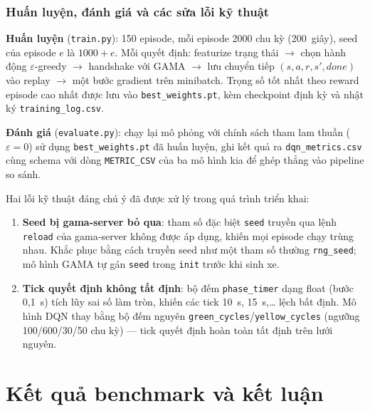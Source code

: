 \documentclass[11pt,a4paper]{article}
\begin{document}
\subsubsection*{Huấn luyện, đánh giá và các sửa lỗi kỹ thuật}

\textbf{Huấn luyện} (\texttt{train.py}): 150 episode, mỗi episode 2000 chu kỳ
(200~giây), seed của episode $e$ là $1000 + e$. Mỗi quyết định: featurize trạng thái
$\rightarrow$ chọn hành động $\varepsilon$-greedy $\rightarrow$ handshake với GAMA
$\rightarrow$ lưu chuyển tiếp $(s, a, r, s', done)$ vào replay $\rightarrow$ một bước
gradient trên minibatch. Trọng số tốt nhất theo reward episode cao nhất được lưu vào
\texttt{best\_weights.pt}, kèm checkpoint định kỳ và nhật ký
\texttt{training\_log.csv}.

\textbf{Đánh giá} (\texttt{evaluate.py}): chạy lại mô phỏng với chính sách tham lam
thuần ($\varepsilon = 0$) sử dụng \texttt{best\_weights.pt} đã huấn luyện, ghi kết quả
ra \texttt{dqn\_metrics.csv} cùng schema với dòng \texttt{METRIC\_CSV} của ba mô hình
kia để ghép thẳng vào pipeline so sánh.

Hai lỗi kỹ thuật đáng chú ý đã được xử lý trong quá trình triển khai:

\begin{enumerate}[leftmargin=*]
    \item \textbf{Seed bị gama-server bỏ qua}: tham số đặc biệt \texttt{seed} truyền
    qua lệnh \texttt{reload} của gama-server không được áp dụng, khiến mọi episode
    chạy trùng nhau. Khắc phục bằng cách truyền seed như một tham số thường
    \texttt{rng\_seed}; mô hình GAMA tự gán \texttt{seed} trong \texttt{init} trước
    khi sinh xe.
    \item \textbf{Tick quyết định không tất định}: bộ đếm \texttt{phase\_timer} dạng
    float (bước 0,1~s) tích lũy sai số làm tròn, khiến các tick 10~s, 15~s,\dots{}
    lệch bất định. Mô hình DQN thay bằng bộ đếm nguyên
    \texttt{green\_cycles}/\texttt{yellow\_cycles} (ngưỡng 100/600/30/50 chu kỳ) ---
    tick quyết định hoàn toàn tất định trên lưới nguyên.
\end{enumerate}

\section{Kết quả benchmark và kết luận}
\end{document}
